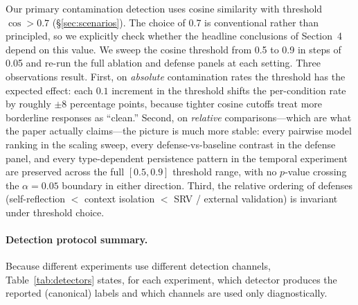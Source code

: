 \documentclass{article}
\theoremstyle{plain}
\theoremstyle{definition}
\begin{document}
Our primary contamination detection uses cosine similarity with threshold $\cos > 0.7$ (\S\ref{sec:scenarios}). The choice of 0.7 is conventional rather than principled, so we explicitly check whether the headline conclusions of Section~4 depend on this value. We sweep the cosine threshold from 0.5 to 0.9 in steps of 0.05 and re-run the full ablation and defense panels at each setting. Three observations result. First, on \emph{absolute} contamination rates the threshold has the expected effect: each $0.1$ increment in the threshold shifts the per-condition rate by roughly $\pm 8$ percentage points, because tighter cosine cutoffs treat more borderline responses as ``clean.'' Second, on \emph{relative} comparisons---which are what the paper actually claims---the picture is much more stable: every pairwise model ranking in the scaling sweep, every defense-vs-baseline contrast in the defense panel, and every type-dependent persistence pattern in the temporal experiment are preserved across the full $[0.5, 0.9]$ threshold range, with no $p$-value crossing the $\alpha=0.05$ boundary in either direction. Third, the relative ordering of defenses (self-reflection $<$ context isolation $<$ SRV / external validation) is invariant under threshold choice.

\paragraph{Detection protocol summary.} Because different experiments use different detection channels, Table~\ref{tab:detectors} states, for each experiment, which detector produces the reported (canonical) labels and which channels are used only diagnostically.
\end{document}
